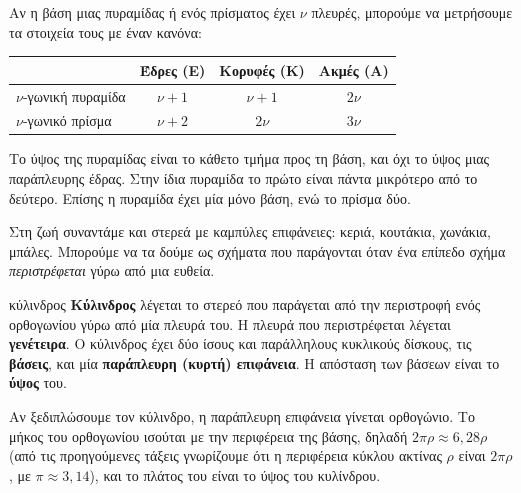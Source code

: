 Αν η βάση μιας πυραμίδας ή ενός πρίσματος έχει $\nu$ πλευρές, μπορούμε να μετρήσουμε τα στοιχεία τους με έναν κανόνα:

\begin{center}
\renewcommand{\arraystretch}{1.4}
\begin{tabular}{@{}lccc@{}}
\toprule
 & \textbf{Έδρες (Ε)} & \textbf{Κορυφές (Κ)} & \textbf{Ακμές (Α)}\\
\midrule
$\nu$-γωνική πυραμίδα & $\nu+1$ & $\nu+1$ & $2\nu$\\
$\nu$-γωνικό πρίσμα & $\nu+2$ & $2\nu$ & $3\nu$\\
\bottomrule
\end{tabular}
\end{center}

\begin{prosoxi}
Το ύψος της πυραμίδας είναι το κάθετο τμήμα προς τη βάση, και όχι το ύψος μιας παράπλευρης έδρας. Στην ίδια πυραμίδα το πρώτο είναι πάντα μικρότερο από το δεύτερο. Επίσης η πυραμίδα έχει μία μόνο βάση, ενώ το πρίσμα δύο.
\end{prosoxi}


Στη ζωή συναντάμε και στερεά με καμπύλες επιφάνειες: κεριά, κουτάκια, χωνάκια, μπάλες. Μπορούμε να τα δούμε ως σχήματα που παράγονται όταν ένα επίπεδο σχήμα \emph{περιστρέφεται} γύρω από μια ευθεία.

\begin{orismos}{κύλινδρος}
\textbf{Κύλινδρος} λέγεται το στερεό που παράγεται από την περιστροφή ενός ορθογωνίου γύρω από μία πλευρά του. Η πλευρά που περιστρέφεται λέγεται \textbf{γενέτειρα}. Ο κύλινδρος έχει δύο ίσους και παράλληλους κυκλικούς δίσκους, τις \textbf{βάσεις}, και μία \textbf{παράπλευρη (κυρτή) επιφάνεια}. Η απόσταση των βάσεων είναι το \textbf{ύψος} του.
\end{orismos}

Αν ξεδιπλώσουμε τον κύλινδρο, η παράπλευρη επιφάνεια γίνεται ορθογώνιο. Το μήκος του ορθογωνίου ισούται με την περιφέρεια της βάσης, δηλαδή $2\pi\rho\approx6{,}28\rho$ (από τις προηγούμενες τάξεις γνωρίζουμε ότι η περιφέρεια κύκλου ακτίνας $\rho$ είναι $2\pi\rho$, με $\pi\approx3{,}14$), και το πλάτος του είναι το ύψος του κυλίνδρου.

\begin{center}
\end{center}

